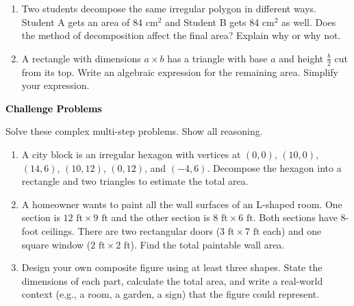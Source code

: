\documentclass[12pt, letterpaper, fleqn]{article}
\begin{document}
\begin{enumerate}[itemsep=2.3cm, leftmargin=0.6cm]

\item Two students decompose the same irregular polygon in different ways. Student A gets an area of 84 cm$^2$ and Student B gets 84 cm$^2$ as well. Does the method of decomposition affect the final area? Explain why or why not.

\vspace{2.2cm}

\item A rectangle with dimensions $a \times b$ has a triangle with base $a$ and height $\frac{b}{2}$ cut from its top. Write an algebraic expression for the remaining area. Simplify your expression.

\vspace{2.5cm}

\end{enumerate}

\newpage

\begin{tcolorbox}[colback=black!10]
\large\textcolor{black}{\textbf{Challenge Problems}}
\end{tcolorbox}

\noindent
Solve these complex multi-step problems. Show all reasoning.

\vspace{3mm}

\begin{enumerate}[itemsep=2.4cm, leftmargin=0.6cm]

\item A city block is an irregular hexagon with vertices at $(0, 0)$, $(10, 0)$, $(14, 6)$, $(10, 12)$, $(0, 12)$, and $(-4, 6)$. Decompose the hexagon into a rectangle and two triangles to estimate the total area.

\vspace{2.3cm}

\item A homeowner wants to paint all the wall surfaces of an L-shaped room. One section is $12\text{ ft} \times 9\text{ ft}$ and the other section is $8\text{ ft} \times 6\text{ ft}$. Both sections have 8-foot ceilings. There are two rectangular doors ($3\text{ ft} \times 7\text{ ft}$ each) and one square window ($2\text{ ft} \times 2\text{ ft}$). Find the total paintable wall area.

\vspace{2.3cm}

\item Design your own composite figure using at least three shapes. State the dimensions of each part, calculate the total area, and write a real-world context (e.g., a room, a garden, a sign) that the figure could represent.

\vspace{2.5cm}

\end{enumerate}
\end{document}
